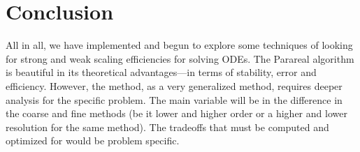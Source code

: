 \documentclass[letterpaper,12pt]{article}
\begin{document}
\section{Conclusion}

All in all, we have implemented and begun to explore some techniques of looking
for strong and weak scaling efficiencies for solving ODEs. The Parareal
algorithm is beautiful in its theoretical advantages---in terms of stability,
error and efficiency. However, the method, as a very generalized method,
requires deeper analysis for the specific problem. The main variable will be in
the difference in the coarse and fine methods (be it lower and higher order or a
higher and lower resolution for the same method). The tradeoffs that must be
computed and optimized for would be problem specific.

\nocite{*}


\end{document}
